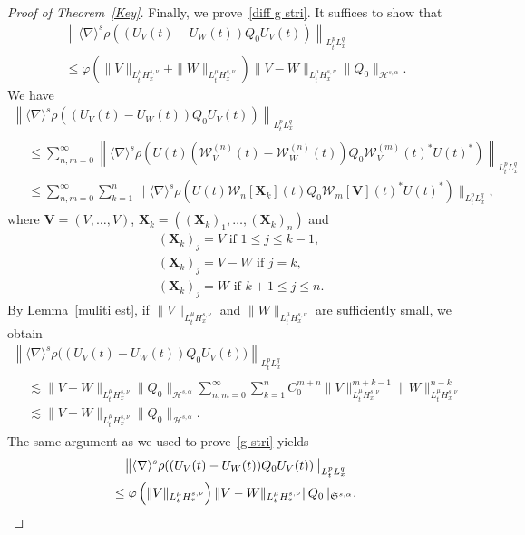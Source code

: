 \documentclass[10pt,a4paper]{amsart}
\providecommand{\No}[1]{\left\| #1 \right\|}
\newcommand{\vV}{{\mathbf{V}}}
\newcommand{\vX}{{\mathbf{X}}}
\newcommand{\CH}{\mathcal{H}}
\newcommand{\CW}{\mathcal{W}}
\newcommand{\FS}{\mathfrak{S}}
\newcommand{\al}{\alpha}
\newcommand{\ph}{\varphi}
\newcommand{\rh}{\rho}
\newcommand{\K}[1]{\left(#1\right)}
\renewcommand{\No}[1]{\left\| #1 \right\|}
\newcommand{\I}{\infty}
\newcommand{\sd}{\langle \nabla \rangle}
\newcommand{\ls}{\lesssim}
\begin{document}
\begin{proof}[{Proof of Theorem~\ref{Key}}]
Finally, we prove~\eqref{diff g stri}. It suffices to show that
\begin{multline}
\left\|\sd^s \rh((U_V(t)-U_W(t)) Q_0 U_V(t))\right\|_{L^p_t L^q_x} \\
\le \ph\left(\|V\|_{L^\mu_t H^{s,\nu}_x} + \|W\|_{L^\mu_t H^{s,\nu}_x}\right)
\|V-W\|_{L^\mu_t H^{s,\nu}_x}
\|Q_0\|_{\CH^{s,\al}}.
\end{multline}
We have
\begin{multline}
\left\|\sd^s \rh\left((U_V(t)-U_W(t)) Q_0 U_V(t)\right)\right\|_{L^p_t L^q_x} \\
\begin{aligned}
&\le \sum_{n,m=0}^\I
\No{
\sd^s \rh\K{U(t)\left(\CW_V^{(n)}(t) - \CW_W^{(n)}(t)\right) Q_0 \CW^{(m)}_V(t)^* U(t)^*} }_{L^p_t L^q_x} \\
&\le \sum_{n,m=0}^\I \sum_{k=1}^n
\big\|
\sd^s \rh\K{U(t) \CW_n[\vX_k](t) Q_0 \CW_m[\vV](t)^* U(t)^*} \big\|_{L^p_t L^q_x},
\end{aligned}
\end{multline}
where $\vV= (V,\dots, V)$, $\vX_k=((\vX_k)_1, \dots, (\vX_k)_n)$ and
\begin{align}
&(\vX_k)_j = V \text{ if } 1 \le j \le k-1, \\
&(\vX_k)_j = V-W \text{ if } j = k, \\
&(\vX_k)_j = W \text{ if } k+1 \le j \le n.
\end{align}
By Lemma~\ref{muliti est}, if $\|V\|_{L^\mu_t H^{s,\nu}_x}$ and $\|W\|_{L^\mu_t H^{s,\nu}_x}$ are sufficiently small, we obtain
\begin{multline}
\left\|\sd^s \rh\big((U_V(t)-U_W(t)) Q_0 U_V(t)\big)\right\|_{L^p_t L^q_x} \\
\begin{aligned}
& \ls \|V-W\|_{L^\mu_t H^{s,\nu}_x}
\|Q_0\|_{\CH^{s,\al}}
\sum_{n,m=0}^\I \sum_{k=1}^n C_0^{m+n}
\|V\|_{L^\mu_t H^{s,\nu}_x}^{m+k-1}
\|W\|_{L^\mu_t H^{s,\nu}_x}^{n-k} \\
&\ls \|V-W\|_{L^\mu_t H^{s,\nu}_x} \|Q_0\|_{\CH^{s,\al}}.
\end{aligned}
\end{multline}
The same argument as we used to prove~\eqref{g stri} yields
\begin{multline}
\big\|\sd^s \rh((U_V(t)-U_W(t)) Q_0 U_V(t))\big\|_{L^p_t L^q_x}
\\
\le \ph\left(\|V\|_{L^\mu_t H^{s,\nu}_x}\right)
\|V-W\|_{L^\mu_t H^{s,\nu}_x}
\|Q_0\|_{\FS^{s,\al}}.\qedhere
\end{multline}
\end{proof}
\end{document}
